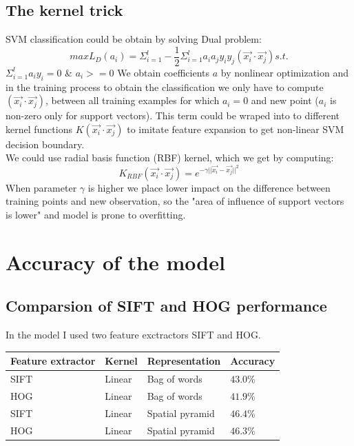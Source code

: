     \subsection*{The kernel trick}
SVM classification could be obtain by solving Dual problem:
$$ max L_{D}(a_{i}) = \Sigma^{l}_{i=1} - \frac{1}{2}\Sigma^{l}_{i=1}a_{i}a_{j}y_{i}y_{j}(\vec{x_{i}}\cdot\vec{x_{j}})s.t.$$
$\Sigma^{l}_{i=1}a_{i}y_{i} = 0$ \& $a_{i} >= 0 $
We obtain coefficients $a$ by nonlinear optimization and in the training process to obtain the classification we only have to compute $(\vec{x_{i}}\cdot\vec{x_{j}})$, between all training examples for which $a_{i}=0$ and new point ($a_{i}$ is non-zero only for support vectors). This term could be wraped into to different kernel functions $K(\vec{x_{i}}\cdot\vec{x_{j}})$ to imitate feature expansion to get non-linear SVM decision boundary.\\

We could use radial basis function (RBF) kernel, which we get by computing:
$$
K_{RBF}(\vec{x_{i}}\cdot\vec{x_{j}}) = e^{-\gamma||\vec{x_{i}} - \vec{x_{j}}||^{2}}
$$
When parameter $\gamma$ is higher we place lower impact on the difference between training points and new observation, so the "area of influence of support vectors is lower" and model is prone to overfitting.

\section*{Accuracy of the model}
    
    \subsection*{Comparsion of SIFT and HOG performance}
In the model I used two feature exctractors SIFT and HOG.

\begin{tabular}{ |p{3cm}|p{3cm}|p{3cm}|p{3cm}|  }
 \hline
 Feature extractor & Kernel & Representation & Accuracy\\
 \hline \hline
 SIFT & Linear & Bag of words & $43.0 \%$\\ \hline
 HOG & Linear & Bag of words & $41.9\%$\\ \hline \hline
 SIFT & Linear & Spatial pyramid & $46.4\%$\\ \hline \hline
 HOG & Linear & Spatial pyramid & $46.3\%$\\ \hline
\end{tabular}
    
